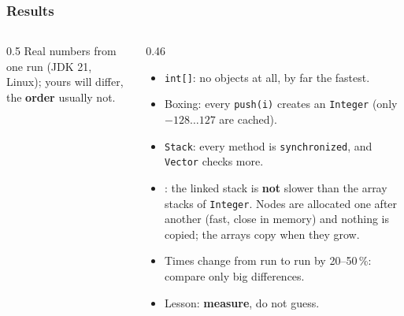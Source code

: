 \documentclass[aspectratio=169,10pt,compress]{beamer}
\begin{document}
\begin{frame}[t,fragile] \frametitle{Results}
  \begin{columns}[T]
    \begin{column}{0.5\textwidth}
      \small Real numbers from one run (JDK 21, Linux); yours will differ, the \textbf{order} usually not.
    \end{column}
    \begin{column}{0.46\textwidth}
      \begin{itemize}\small
        \item \texttt{int[]}: no objects at all, by far the fastest.
        \item Boxing: every \texttt{push(i)} creates an \texttt{Integer} (only $-128 \dots 127$ are cached).
        \item \texttt{Stack}: every method is \texttt{synchronized}, and \texttt{Vector} checks more.
        \item {}: the linked stack is \textbf{not} slower than the array stacks of \texttt{Integer}. Nodes are allocated
              one after another (fast, close in memory) and nothing is copied; the arrays copy when they grow.
        \item Times change from run to run by 20--50\,\%: compare only big differences.
        \item Lesson: \textbf{measure}, do not guess.
      \end{itemize}
    \end{column}
  \end{columns}
\end{frame}
\end{document}
